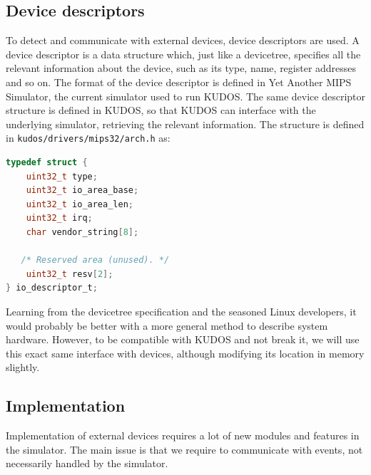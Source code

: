 \subsection{Device descriptors}
To detect and communicate with external devices, device descriptors are used.
A device descriptor is a data structure which, just like a devicetree, specifies
all the relevant information about the device, such as its type, name, register
addresses and so on. The format of the device descriptor is defined in Yet Another
MIPS Simulator, the current simulator used to run KUDOS. The same device descriptor
structure is defined in KUDOS, so that KUDOS can interface with the underlying
simulator, retrieving the relevant information.
The structure is defined in \texttt{kudos/drivers/mips32/arch.h}\cite{kudos} as:
\begin{lstlisting}[language=c]
typedef struct {
    uint32_t type;
    uint32_t io_area_base;
    uint32_t io_area_len;
    uint32_t irq;
    char vendor_string[8];

   /* Reserved area (unused). */
    uint32_t resv[2];
} io_descriptor_t;
\end{lstlisting}

Learning from the devicetree specification and the seasoned Linux developers,
it would probably be better with a more general method to describe system
hardware. However, to be compatible with KUDOS and not break it, we will use
this exact same interface with devices, although modifying its location in
memory slightly.


\subsection{Implementation}
Implementation of external devices requires a lot of new modules and features
in the simulator. The main issue is that we require to communicate with
events, not necessarily handled by the simulator.



